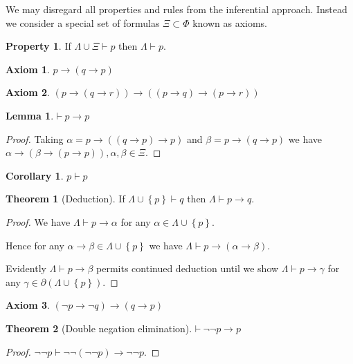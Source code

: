 \documentclass{amsbook}
\newcommand{\setsm}[1]{\left\{#1\right\}}
\newcommand{\infers}{\mathrel\vdash}
\newcommand{\theorem}{\mathord\vdash\medspace}
\newcommand{\then}{\mathrel\rightarrow}
\theoremstyle{definition}
\newtheorem{axm}{Axiom}[chapter]
\newtheorem{prop}{Property}[section]
\newtheorem{thm}{Theorem}[section]
\newtheorem{lmm}{Lemma}[section]
\newtheorem{crl}{Corollary}[section]
\begin{document}
We may disregard all properties and rules from the inferential approach. Instead we consider a special set of formulas $\Xi \subset \Phi$ known as axioms.

\begin{prop}
    If $\varLambda \cup \Xi \infers p$ then $\varLambda \infers p$.
\end{prop}

\begin{axm}
    $p \then (q \then p)$
\end{axm}

\begin{axm}
    $(p \then (q \then r)) \then ((p \then q) \then (p \then r))$
\end{axm}

\begin{lmm}
    $\theorem p \then p$
    \begin{proof}
        Taking $\alpha = p \then ((q \then p) \then p)$ and $\beta = p \then (q \then p)$ we have $\alpha \then (\beta \then (p \then p)), \alpha, \beta \in \Xi$.
    \end{proof}
\end{lmm}

\begin{crl}
    $p \infers p$
\end{crl}

\begin{thm}[Deduction]
    If $\varLambda \cup \setsm p \infers q$ then $\varLambda \infers p \then q$.
    \begin{proof}
        We have $\varLambda \infers p \then \alpha$ for any $\alpha \in \varLambda \cup \setsm p$.

        Hence for any $\alpha \then \beta \in \varLambda \cup \setsm p$ we have $\varLambda \infers p \then (\alpha \then \beta)$.

        Evidently $\varLambda \infers p \then \beta$ permits continued deduction until we show $\varLambda \infers p \then \gamma$ for any $\gamma \in \partial(\varLambda \cup \setsm p)$.
    \end{proof}
\end{thm}

\begin{axm}
    $(\neg p \then \neg q) \then (q \then p)$
\end{axm}

\begin{thm}[Double negation elimination]
    $\theorem \neg\neg p \then p$
    \begin{proof}
        $\neg\neg p \infers \neg\neg(\neg\neg p) \then \neg\neg p$.
    \end{proof}
\end{thm}
\end{document}
